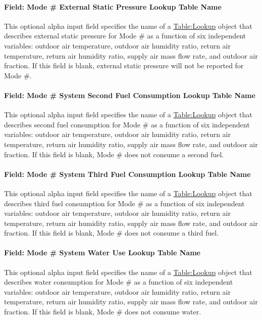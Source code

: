 \paragraph{Field: Mode \# External Static Pressure Lookup Table Name}
This optional alpha input field specifies the name of a \hyperref[tablelookup]{Table:Lookup} object that describes external static pressure for Mode \# as a function of six independent variables: outdoor air temperature, outdoor air humidity ratio, return air temperature, return air humidity ratio, supply air mass flow rate, and outdoor air fraction. If this field is blank, external static pressure will not be reported for Mode \#.

\paragraph{Field: Mode \# System Second Fuel Consumption Lookup Table Name}
This optional alpha input field specifies the name of a \hyperref[tablelookup]{Table:Lookup} object that describes second fuel consumption for Mode \# as a function of six independent variables: outdoor air temperature, outdoor air humidity ratio, return air temperature, return air humidity ratio, supply air mass flow rate, and outdoor air fraction. If this field is blank, Mode \# does not consume a second fuel.

\paragraph{Field: Mode \# System Third Fuel Consumption Lookup Table Name}
This optional alpha input field specifies the name of a \hyperref[tablelookup]{Table:Lookup} object that describes third fuel consumption for Mode \# as a function of six independent variables: outdoor air temperature, outdoor air humidity ratio, return air temperature, return air humidity ratio, supply air mass flow rate, and outdoor air fraction. If this field is blank, Mode \# does not consume a third fuel.

\paragraph{Field: Mode \# System Water Use Lookup Table Name}
This optional alpha input field specifies the name of a \hyperref[tablelookup]{Table:Lookup} object that describes water consumption for Mode \# as a function of six independent variables: outdoor air temperature, outdoor air humidity ratio, return air temperature, return air humidity ratio, supply air mass flow rate, and outdoor air fraction. If this field is blank, Mode \# does not consume water.

